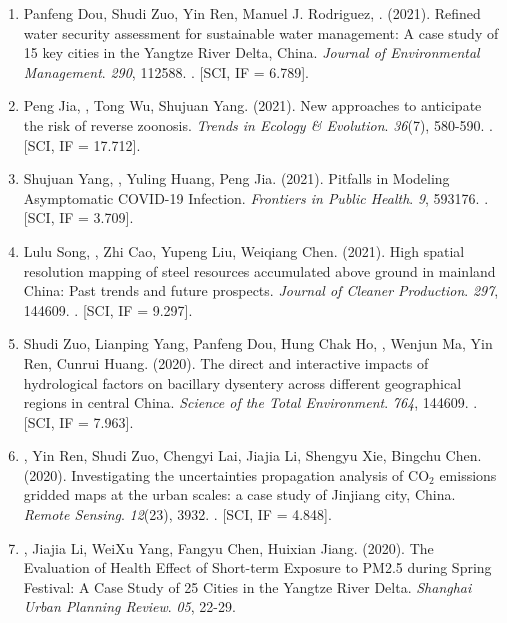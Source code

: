 \begin{enumerate}
\item
    Panfeng Dou, Shudi Zuo, Yin Ren, Manuel J. Rodriguez, \Shaoqing. (2021).
    Refined water security assessment for sustainable water management: A case study of 15 key cities in the Yangtze River Delta, China.
    \textit{Journal of Environmental Management}. \textit{290}, 112588.
    . [SCI, IF = 6.789].
\item
    Peng Jia, \Shaoqing, Tong Wu, Shujuan Yang. (2021).
    New approaches to anticipate the risk of reverse zoonosis.
    \textit{Trends in Ecology \& Evolution}. \textit{36}(7), 580-590.
    . [SCI, IF = 17.712].
\item
    Shujuan Yang, \Shaoqing, Yuling Huang, Peng Jia. (2021).
    Pitfalls in Modeling Asymptomatic COVID-19 Infection.
    \textit{Frontiers in Public Health}. \textit{9}, 593176.
    . [SCI, IF = 3.709].
\item
    Lulu Song, \Shaoqing, Zhi Cao, Yupeng Liu, Weiqiang Chen. (2021).
    High spatial resolution mapping of steel resources accumulated above ground in mainland China: Past trends and future prospects.
    \textit{Journal of Cleaner Production}. \textit{297}, 144609.
    . [SCI, IF = 9.297].
\item
    Shudi Zuo, Lianping Yang, Panfeng Dou, Hung Chak Ho, \Shaoqing, Wenjun Ma, Yin Ren, Cunrui Huang. (2020).
    The direct and interactive impacts of hydrological factors on bacillary dysentery across different geographical regions in central China.
    \textit{Science of the Total Environment}. \textit{764}, 144609.
    . [SCI, IF = 7.963].
\item
    \Shaoqing\CF, Yin Ren\CF, Shudi Zuo, Chengyi Lai, Jiajia Li, Shengyu Xie, Bingchu Chen. (2020).
    Investigating the uncertainties propagation analysis of CO$_2$ emissions gridded maps at the urban scales: a case study of Jinjiang city, China. 
    \textit{Remote Sensing}. \textit{12}(23), 3932.
    . [SCI, IF = 4.848].
\item
    \Shaoqing, Jiajia Li, WeiXu Yang, Fangyu Chen, Huixian Jiang. (2020).
    The Evaluation of Health Effect of Short-term Exposure to PM2.5 during Spring Festival: A Case Study of 25 Cities in the Yangtze River Delta.
    \textit{Shanghai Urban Planning Review}. \textit{05}, 22-29.

\end{enumerate}
